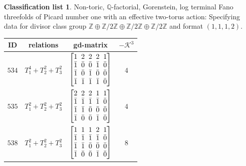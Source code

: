 \documentclass[pdftex]{sigma}%
\theoremstyle{definition}
\newtheorem{class-list}[thm]{Classification list}
\def\ZZ{{\mathbb Z}}
\def\QQ{{\mathbb Q}}
\numberwithin{equation}{section}
\begin{document}
\begin{class-list}
Non-toric, $\QQ$-factorial, Gorenstein, log terminal Fano
threefolds of Picard number one with an effective two-torus action:
Specifying data for divisor class group
$\ZZ\oplus \ZZ/2\ZZ\oplus \ZZ/2\ZZ\oplus \ZZ/2\ZZ$ and format $(1,1,1,2)$.
\begin{table}[h!]\centering\setlength{\tabcolsep}{3.5pt}
\renewcommand{\arraystretch}{1.1}\small\tabulinesep=1mm
\begin{tabu}{c|c|c|c}
\hline
ID&relations&gd-matrix&$-\mathcal{K}^3$
\\
\hline
${534}$&${T_{1}^{4}+T_{2}^{2}+T_{3}^{2}}$
&$\arraycolsep=1mm\begin{bmatrix}{1} & {2} & {2} & {2} & {1} \\ {\bar{1}} & {\bar{0}} & {\bar{0}} & {\bar{1}} & {\bar{0}} \\ {\bar{1}} & {\bar{0}} & {\bar{1}} & {\bar{0}} & {\bar{0}} \\ {\bar{1}} & {\bar{1}} & {\bar{1}} & {\bar{1}} & {\bar{0}}\end{bmatrix}$
&${4}$
\\
\hline
${535}$&${T_{1}^{2}+T_{2}^{2}+T_{3}^{2}}$
&$\arraycolsep=1mm\begin{bmatrix}{2} & {2} & {2} & {1} & {1} \\ {\bar{1}} & {\bar{1}} & {\bar{1}} & {\bar{1}} & {\bar{0}} \\ {\bar{1}} & {\bar{1}} & {\bar{0}} & {\bar{0}} & {\bar{0}} \\ {\bar{1}} & {\bar{0}} & {\bar{0}} & {\bar{1}} & {\bar{0}}\end{bmatrix}$
&${4}$
\\
\hline
${538}$&${T_{1}^{2}+T_{2}^{2}+T_{3}^{2}}$
&$\arraycolsep=1mm\begin{bmatrix}{1} & {1} & {1} & {2} & {1} \\ {\bar{1}} & {\bar{1}} & {\bar{1}} & {\bar{1}} & {\bar{0}} \\ {\bar{1}} & {\bar{1}} & {\bar{0}} & {\bar{0}} & {\bar{0}} \\ {\bar{1}} & {\bar{0}} & {\bar{0}} & {\bar{1}} & {\bar{0}}\end{bmatrix}$
&${8}$
\\
\hline
\end{tabu}\vspace{-2mm}
\end{table}
\end{class-list}
\end{document}
